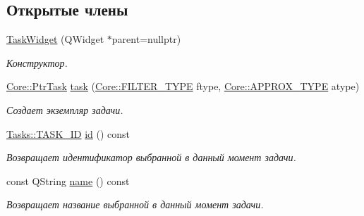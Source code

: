 \subsection*{Открытые члены}
\begin{DoxyCompactItemize}
\item 
\hyperlink{class_task_widget_a31d14904360a3ecc57057aea4b606001}{Task\+Widget} (Q\+Widget $\ast$parent=nullptr)\hypertarget{class_task_widget_a31d14904360a3ecc57057aea4b606001}{}\label{class_task_widget_a31d14904360a3ecc57057aea4b606001}

\begin{DoxyCompactList}\small\item\em Конструктор. \end{DoxyCompactList}\item 
\hyperlink{namespace_core_abfda8f69fcacfcea2696549b548ed737}{Core\+::\+Ptr\+Task} \hyperlink{class_task_widget_a03ef83e365334749bac31e04d205e3df}{task} (\hyperlink{namespace_core_af88278693f3c866f217da796f4bb9af7}{Core\+::\+F\+I\+L\+T\+E\+R\+\_\+\+T\+Y\+PE} ftype, \hyperlink{namespace_core_acd67f53ff1d9b21fabb1da4474a8f7d9}{Core\+::\+A\+P\+P\+R\+O\+X\+\_\+\+T\+Y\+PE} atype)
\begin{DoxyCompactList}\small\item\em Создает экземпляр задачи. \end{DoxyCompactList}\item 
\hyperlink{namespace_tasks_acf6b541f8ce51b63eb9fcb8748317707}{Tasks\+::\+T\+A\+S\+K\+\_\+\+ID} \hyperlink{class_task_widget_a89c57ebdf08c55cc01407659d25f9d16}{id} () const \hypertarget{class_task_widget_a89c57ebdf08c55cc01407659d25f9d16}{}\label{class_task_widget_a89c57ebdf08c55cc01407659d25f9d16}

\begin{DoxyCompactList}\small\item\em Возвращает идентификатор выбранной в данный момент задачи. \end{DoxyCompactList}\item 
const Q\+String \hyperlink{class_task_widget_a1ba098ad6fa814c43e83745ccb96c30e}{name} () const \hypertarget{class_task_widget_a1ba098ad6fa814c43e83745ccb96c30e}{}\label{class_task_widget_a1ba098ad6fa814c43e83745ccb96c30e}

\begin{DoxyCompactList}\small\item\em Возвращает название выбранной в данный момент задачи. \end{DoxyCompactList}\end{DoxyCompactItemize}
